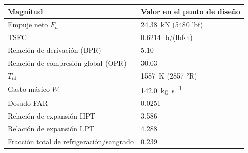 \begin{tabular}{ll}
\toprule
Magnitud & Valor en el punto de diseño \\
\midrule
  Empuje neto $F_n$ & \SI{24.38}{\kilo\newton} (\num{5480} lbf) \\
  TSFC & \num{0.6214} lb/(lbf$\cdot$h) \\
  Relación de derivación (BPR) & \num{5.10} \\
  Relación de compresión global (OPR) & \num{30.03} \\
  $T_{t4}$ & \SI{1587}{\kelvin} (\num{2857} °R) \\
  Gasto másico $W$ & \SI{142.0}{\kilo\gram\per\second} \\
  Dosado FAR & \num{0.0251} \\
  Relación de expansión HPT & \num{3.586} \\
  Relación de expansión LPT & \num{4.288} \\
  Fracción total de refrigeración/sangrado & \num{0.239} \\
\bottomrule
\end{tabular}

